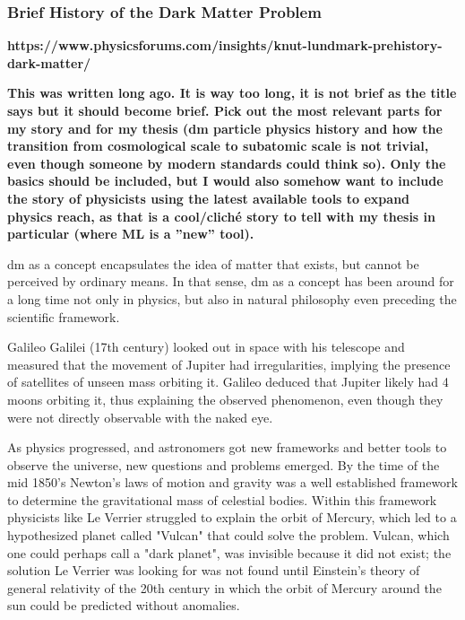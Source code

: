\subsubsection{Brief History of the Dark Matter Problem}
\label{sec:history}



\textbf{https://www.physicsforums.com/insights/knut-lundmark-prehistory-dark-matter/}

\textbf{This was written long ago. It is way too long, it is not brief as the title says but it should become brief. Pick out the most relevant parts for my story and for my thesis (\gls{dm} particle physics history and how the transition from cosmological scale to subatomic scale is not trivial, even though someone by modern standards could think so). Only the basics should be included, but I would also somehow want to include the story of physicists using the latest available tools to expand physics reach, as that is a cool/cliché story to tell with my thesis in particular (where ML is a ''new'' tool).}

\gls{dm} as a concept encapsulates the idea of matter that exists, but cannot be perceived by ordinary means. In that sense, \gls{dm} as a concept has been around for a long time not only in physics, but also in natural philosophy even preceding the scientific framework. \cite{bertone2016-history-dark-matter}

Galileo Galilei (17th century) looked out in space with his telescope and measured that the movement of Jupiter had irregularities, implying the presence of satellites of unseen mass orbiting it. Galileo deduced that Jupiter likely had 4 moons orbiting it, thus explaining the observed phenomenon, even though they were not directly observable with the naked eye. \cite{bertone2016-history-dark-matter}

As physics progressed, and astronomers got new frameworks and better tools to observe the universe, new questions and problems emerged. By the time of the mid 1850’s Newton’s laws of motion and gravity was a well established framework to determine the gravitational mass of celestial bodies. Within this framework physicists like Le Verrier struggled to explain the orbit of Mercury, which led to a hypothesized planet called "Vulcan" that could solve the problem. Vulcan, which one could perhaps call a "dark planet", was invisible because it did not exist; the solution Le Verrier was looking for was not found until Einstein's theory of general relativity of the 20th century in which the orbit of Mercury around the sun could be predicted without anomalies. \cite{bertone2016-history-dark-matter}

